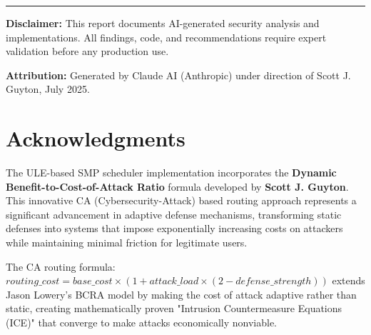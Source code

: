 \documentclass[11pt,a4paper]{article}
\begin{document}
\vspace{2cm}

\hrule

\vspace{0.5cm}

\textbf{Disclaimer:} This report documents AI-generated security analysis and implementations. All findings, code, and recommendations require expert validation before any production use.

\textbf{Attribution:} Generated by Claude AI (Anthropic) under direction of Scott J. Guyton, July 2025.

\section{Acknowledgments}

The ULE-based SMP scheduler implementation incorporates the \textbf{Dynamic Benefit-to-Cost-of-Attack Ratio} formula developed by \textbf{Scott J. Guyton}. This innovative CA (Cybersecurity-Attack) based routing approach represents a significant advancement in adaptive defense mechanisms, transforming static defenses into systems that impose exponentially increasing costs on attackers while maintaining minimal friction for legitimate users.

The CA routing formula: $routing\_cost = base\_cost \times (1 + attack\_load \times (2 - defense\_strength))$ extends Jason Lowery's BCRA model by making the cost of attack adaptive rather than static, creating mathematically proven "Intrusion Countermeasure Equations (ICE)" that converge to make attacks economically nonviable.
\end{document}
